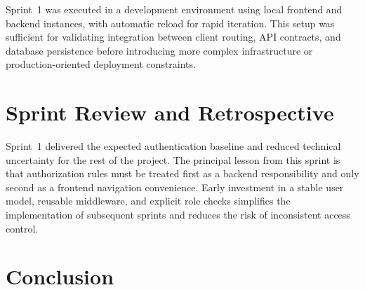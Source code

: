 \documentclass[a4paper,12pt]{report}
\begin{document}
Sprint~1 was executed in a development environment using local frontend and backend instances, with automatic reload for rapid iteration. This setup was sufficient for validating integration between client routing, API contracts, and database persistence before introducing more complex infrastructure or production-oriented deployment constraints.

\section{Sprint Review and Retrospective}
\label{sec:sprint1-review}

Sprint~1 delivered the expected authentication baseline and reduced technical uncertainty for the rest of the project. The principal lesson from this sprint is that authorization rules must be treated first as a backend responsibility and only second as a frontend navigation convenience. Early investment in a stable user model, reusable middleware, and explicit role checks simplifies the implementation of subsequent sprints and reduces the risk of inconsistent access control.

\section{Conclusion}
\label{sec:sprint1-conclusion}
\end{document}
